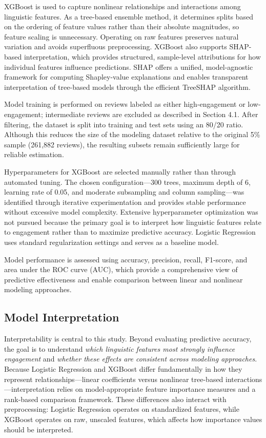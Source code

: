 \documentclass[12pt]{article}
\begin{document}
XGBoost is used to capture nonlinear relationships and interactions among linguistic features. As a tree-based ensemble method, it determines splits based on the ordering of feature values rather than their absolute magnitudes, so feature scaling is unnecessary. Operating on raw features preserves natural variation and avoids superfluous preprocessing. XGBoost also supports SHAP-based interpretation, which provides structured, sample-level attributions for how individual features influence predictions. SHAP offers a unified, model-agnostic framework for computing Shapley-value explanations and enables transparent interpretation of tree-based models through the efficient TreeSHAP algorithm.

Model training is performed on reviews labeled as either high-engagement or low-engagement; intermediate reviews are excluded as described in Section 4.1. After filtering, the dataset is split into training and test sets using an 80/20 ratio. Although this reduces the size of the modeling dataset relative to the original 5\% sample (261,882 reviews), the resulting subsets remain sufficiently large for reliable estimation.

Hyperparameters for XGBoost are selected manually rather than through automated tuning. The chosen configuration—300 trees, maximum depth of 6, learning rate of 0.05, and moderate subsampling and column sampling—was identified through iterative experimentation and provides stable performance without excessive model complexity. Extensive hyperparameter optimization was not pursued because the primary goal is to interpret how linguistic features relate to engagement rather than to maximize predictive accuracy. Logistic Regression uses standard regularization settings and serves as a baseline model.

Model performance is assessed using accuracy, precision, recall, F1-score, and area under the ROC curve (AUC), which provide a comprehensive view of predictive effectiveness and enable comparison between linear and nonlinear modeling approaches.

\subsection{Model Interpretation}

Interpretability is central to this study. Beyond evaluating predictive accuracy, the goal is to understand \emph{which linguistic features most strongly influence engagement} and \emph{whether these effects are consistent across modeling approaches}. Because Logistic Regression and XGBoost differ fundamentally in how they represent relationships—linear coefficients versus nonlinear tree-based interactions—interpretation relies on model-appropriate feature importance measures and a rank-based comparison framework. These differences also interact with preprocessing: Logistic Regression operates on standardized features, while XGBoost operates on raw, unscaled features, which affects how importance values should be interpreted.
\end{document}

